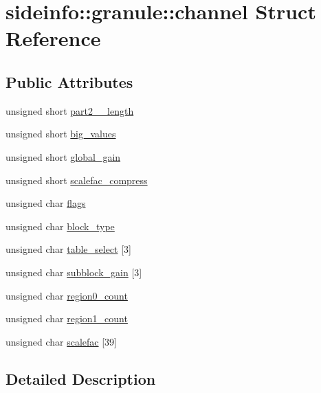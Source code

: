 \hypertarget{structsideinfo_1_1granule_1_1channel}{}\section{sideinfo\+:\+:granule\+:\+:channel Struct Reference}
\label{structsideinfo_1_1granule_1_1channel}
\subsection*{Public Attributes}
\begin{DoxyCompactItemize}
\item 
unsigned short \hyperlink{structsideinfo_1_1granule_1_1channel_ab91b3f248c847aa0cb42059aba1d25de}{part2\+\_\+\_\+length}
\item 
unsigned short \hyperlink{structsideinfo_1_1granule_1_1channel_ae82ea84768517990506fca7f240236ce}{big\+\_\+values}
\item 
unsigned short \hyperlink{structsideinfo_1_1granule_1_1channel_afef63e5f5ebf2781745789ad573b25f0}{global\+\_\+gain}
\item 
unsigned short \hyperlink{structsideinfo_1_1granule_1_1channel_aeecf660a5b7563c665e15c3aaa07440a}{scalefac\+\_\+compress}
\item 
unsigned char \hyperlink{structsideinfo_1_1granule_1_1channel_a4042dc53877794c9847442f20250aa9c}{flags}
\item 
unsigned char \hyperlink{structsideinfo_1_1granule_1_1channel_a02a0e1f29d5d9c51ebad223358cc5e92}{block\+\_\+type}
\item 
unsigned char \hyperlink{structsideinfo_1_1granule_1_1channel_ada65e9ee935da3f6e430851ddadec05e}{table\+\_\+select} \mbox{[}3\mbox{]}
\item 
unsigned char \hyperlink{structsideinfo_1_1granule_1_1channel_a1e49797f7a524a4b029a4c4a8c5eb80e}{subblock\+\_\+gain} \mbox{[}3\mbox{]}
\item 
unsigned char \hyperlink{structsideinfo_1_1granule_1_1channel_a1f3d769302d1b0a2d0ac91ee3fd7fd3e}{region0\+\_\+count}
\item 
unsigned char \hyperlink{structsideinfo_1_1granule_1_1channel_af29c059b626881786ddf5646ee4c3029}{region1\+\_\+count}
\item 
unsigned char \hyperlink{structsideinfo_1_1granule_1_1channel_a38713fd50e3d29452f4cb887568e6ebc}{scalefac} \mbox{[}39\mbox{]}
\end{DoxyCompactItemize}


\subsection{Detailed Description}


